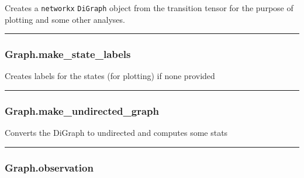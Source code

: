 Creates a \texttt{networkx} \texttt{DiGraph} object from the transition
tensor for the purpose of plotting and some other analyses.

\begin{center}\rule{0.5\linewidth}{\linethickness}\end{center}

\hypertarget{graph.make_state_labels}{%
\subsubsection{Graph.make\_state\_labels}\label{graph.make_state_labels}}

\begin{Shaded}
\begin{Highlighting}[]
\NormalTok{)}
\end{Highlighting}
\end{Shaded}

Creates labels for the states (for plotting) if none provided

\begin{center}\rule{0.5\linewidth}{\linethickness}\end{center}

\hypertarget{graph.make_undirected_graph}{%
\subsubsection{Graph.make\_undirected\_graph}\label{graph.make_undirected_graph}}

\begin{Shaded}
\begin{Highlighting}[]
\NormalTok{)}
\end{Highlighting}
\end{Shaded}

Converts the DiGraph to undirected and computes some stats

\begin{center}\rule{0.5\linewidth}{\linethickness}\end{center}

\hypertarget{graph.observation}{%
\subsubsection{Graph.observation}\label{graph.observation}}

\begin{Shaded}
\begin{Highlighting}[]
\NormalTok{)}
\end{Highlighting}
\end{Shaded}

